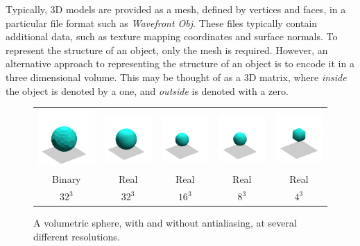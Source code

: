 Typically, 3D models are provided as a mesh, defined by vertices and
faces, in a particular file format such as \textit{Wavefront
  Obj}. These files typically contain additional data, such as texture
mapping coordinates and surface normals. To represent the structure of
an object, only the mesh is required. However, an alternative approach
to representing the structure of an object is to encode it in a three
dimensional volume. This may be thought of as a 3D matrix, where
\textit{inside} the object is denoted by a one, and \textit{outside}
is denoted with a zero.

\begin{figure}
  \begin{tabular}{ccccc}
    \includegraphics[width=0.18\linewidth]{chapter_background/img/binary_32x32x32.png} &
    \includegraphics[width=0.18\linewidth]{chapter_background/img/real_32x32x32.png} &
    \includegraphics[width=0.18\linewidth]{chapter_background/img/real_16x16x16.png} &
    \includegraphics[width=0.18\linewidth]{chapter_background/img/real_8x8x8.png} &
    \includegraphics[width=0.18\linewidth]{chapter_background/img/real_4x4x4.png}
    \\
    Binary & Real & Real & Real & Real \\
    $32^3$ & $32^3$ & $16^3$ & $8^3$ & $4^3$ \\
  \end{tabular}
  \caption[Volumetric antialiasing at different resolutions]{A
    volumetric sphere, with and without antialiasing, at several
    different resolutions.}
  \label{fig:background:volquality}
\end{figure}

